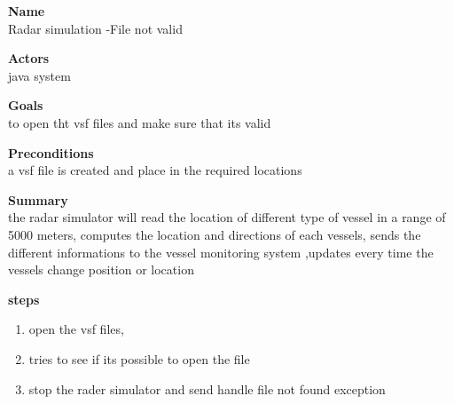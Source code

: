 \documentclass{article}
\begin{document}
\noindent
{\bf Name}\\
Radar simulation -File not valid 

\noindent
{\bf Actors}\\
java system 

\noindent
{\bf Goals}\\
to open tht vsf files and make sure that its valid 

\noindent
{\bf Preconditions }\\
a vsf  file is created and place in the required locations 


\noindent
{\bf Summary }\\
the radar simulator will read the location of different type of vessel in a range of 5000 meters,
computes the location and directions of each vessels, 
sends the different informations to the vessel monitoring system ,updates every time the vessels  
change position or location

\noindent
{\bf steps }\\
\begin{enumerate}
\item open the vsf files, 
\item tries to see if its possible to open the file 
\item stop the rader simulator and send handle file not found exception 
\end{enumerate} 
\end{document}
